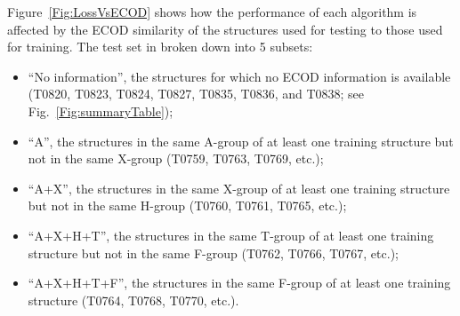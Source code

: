 \documentclass[letter,10pt]{article}
\begin{document}
Figure~\ref{Fig:LossVsECOD} shows how the performance of each
algorithm is affected by the ECOD similarity of the structures used
for testing to those used for training. The test set in broken down
into 5 subsets:
\begin{itemize}
\item
``No information'', the structures for which no ECOD information is
available (T0820, T0823, T0824, T0827, T0835, T0836, and T0838; see
Fig.~\ref{Fig:summaryTable});
\item
``A'', the structures in the same A-group of at least one training
structure but not in the same X-group (T0759, T0763, T0769, etc.);
\item
``A+X'', the structures in the same X-group of at least one training
structure but not in the same H-group (T0760, T0761, T0765, etc.);
\item
``A+X+H+T'', the structures in the same T-group of at least one
training structure but not in the same F-group (T0762, T0766, T0767,
etc.);
\item
``A+X+H+T+F'', the structures in the same F-group of at least one
training structure (T0764, T0768, T0770, etc.).
\end{itemize}
%
%
%
%
%
\end{document}
